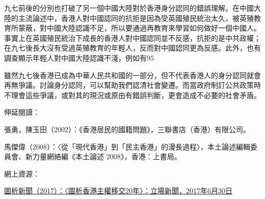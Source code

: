 九七前後的分別也打破了另一個中國大陸對於香港身分認同的錯誤理解。在中國大陸的主流論述中，香港人對中國認同的抗拒是因為受英國殖民統治太久，被英殖教育所蒙蔽，對中國大陸認識不足，所以要通過再教育來學習如何做好一個中國人。事實上在英國殖民統治下成長的香港人對中國認同並不反感，抗拒的是中共政權；在九七後長大沒有受過英殖教育的年輕人，反而對中國認同更為反感。此外，也有調查顯示年輕人對中國大陸認識不淺，例如有95%

雖然九七後香港已成為中華人民共和國的一部分，但不代表香港人的身分認同就會再無爭議。討論身分認同，可以幫助我們認清社會變遷。而當政府制訂公共政策時不理會這些爭議，或對其的現況或原由有錯誤判斷，更會造成不必要的社會矛盾。



伸延閱讀：

張勇，陳玉田（2002）：《香港居民的國籍問題》，三聯書店（香港）有限公司。

馬傑偉（2008）：〈從「現代香港」到「民主香港」的漫長過程〉，本土論述編輯委員會、新力量網絡編《本土論述 2008》，香港：上書局。

網上資源：

\href{https://thestandnews.com/politics/圖析香港主權移交20年/}{圖析新聞（2017）：〈圖析香港主權移交20年〉：立場新聞，2017年6月30日}